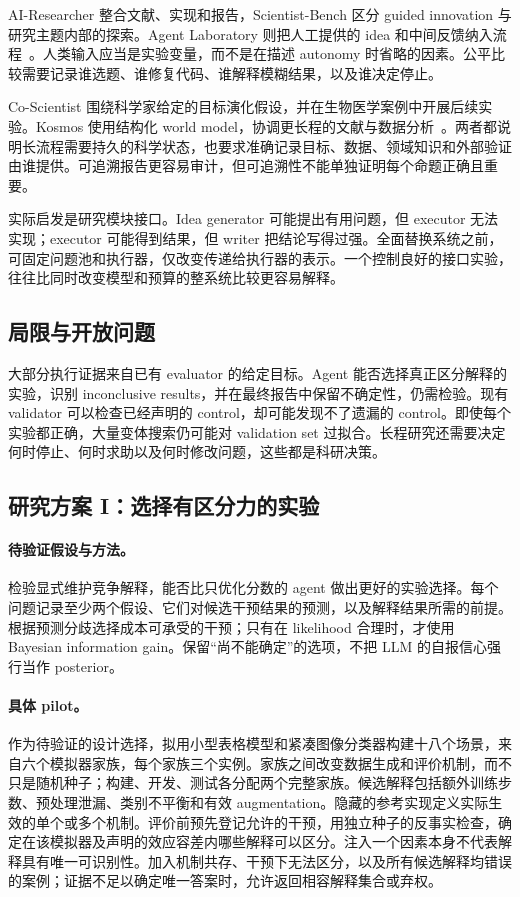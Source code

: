 AI-Researcher 整合文献、实现和报告，Scientist-Bench 区分 guided innovation 与研究主题内部的探索。Agent Laboratory 则把人工提供的 idea 和中间反馈纳入流程~\cite{ai-researcher,agent-laboratory}。人类输入应当是实验变量，而不是在描述 autonomy 时省略的因素。公平比较需要记录谁选题、谁修复代码、谁解释模糊结果，以及谁决定停止。

Co-Scientist 围绕科学家给定的目标演化假设，并在生物医学案例中开展后续实验。Kosmos 使用结构化 world model，协调更长程的文献与数据分析~\cite{co-scientist,kosmos}。两者都说明长流程需要持久的科学状态，也要求准确记录目标、数据、领域知识和外部验证由谁提供。可追溯报告更容易审计，但可追溯性不能单独证明每个命题正确且重要。

实际启发是研究模块接口。Idea generator 可能提出有用问题，但 executor 无法实现；executor 可能得到结果，但 writer 把结论写得过强。全面替换系统之前，可固定问题池和执行器，仅改变传递给执行器的表示。一个控制良好的接口实验，往往比同时改变模型和预算的整系统比较更容易解释。

\subsection{局限与开放问题}

大部分执行证据来自已有 evaluator 的给定目标。Agent 能否选择真正区分解释的实验，识别 inconclusive results，并在最终报告中保留不确定性，仍需检验。现有 validator 可以检查已经声明的 control，却可能发现不了遗漏的 control。即使每个实验都正确，大量变体搜索仍可能对 validation set 过拟合。长程研究还需要决定何时停止、何时求助以及何时修改问题，这些都是科研决策。

\subsection{研究方案 I：选择有区分力的实验}

\paragraph{待验证假设与方法。}
检验显式维护竞争解释，能否比只优化分数的 agent 做出更好的实验选择。每个问题记录至少两个假设、它们对候选干预结果的预测，以及解释结果所需的前提。根据预测分歧选择成本可承受的干预；只有在 likelihood 合理时，才使用 Bayesian information gain。保留“尚不能确定”的选项，不把 LLM 的自报信心强行当作 posterior。

\paragraph{具体 pilot。}
作为待验证的设计选择，拟用小型表格模型和紧凑图像分类器构建十八个场景，来自六个模拟器家族，每个家族三个实例。家族之间改变数据生成和评价机制，而不只是随机种子；构建、开发、测试各分配两个完整家族。候选解释包括额外训练步数、预处理泄漏、类别不平衡和有效 augmentation。隐藏的参考实现定义实际生效的单个或多个机制。评价前预先登记允许的干预，用独立种子的反事实检查，确定在该模拟器及声明的效应容差内哪些解释可以区分。注入一个因素本身不代表解释具有唯一可识别性。加入机制共存、干预下无法区分，以及所有候选解释均错误的案例；证据不足以确定唯一答案时，允许返回相容解释集合或弃权。

